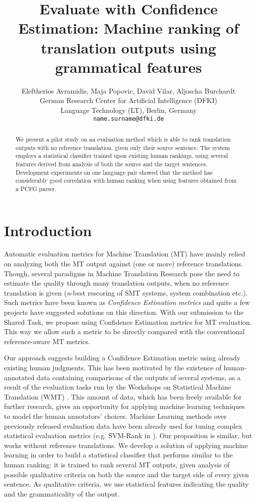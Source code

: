 \documentclass[11pt]{article}
\title{Evaluate with Confidence Estimation: Machine ranking of translation
outputs using grammatical features}
\author{
  Eleftherios Avramidis, Maja Popovic, David Vilar, Aljoscha Burchardt \\
  German Research Center for Artificial Intelligence (DFKI) \\
  Language Technology (LT), Berlin, Germany \\
  {\tt name.surname@dfki.de} 
  }
\date{}
\begin{document}
\maketitle
\begin{abstract}
We present a pilot study on an evaluation method which is able to rank 
translation outputs with no reference translation, given only their source sentence. The
system employs a statistical classifier trained upon existing human rankings, 
using several features derived from analysis of both the source and the target
sentences. Development experiments on one language pair showed that the method
has considerably good correlation with human ranking when using features
obtained from a PCFG parser.
  
\end{abstract}

\section{Introduction}
Automatic evaluation metrics for Machine Translation (MT) have mainly relied on
analyzing both the MT output against (one or more) reference translations.
Though, several paradigms in Machine Translation Research pose the need to
estimate the quality through many translation outputs, when no reference
translation is given (\textit{n}-best rescoring of SMT systems, system
combination etc.). Such metrics have been known as \textit{Confidence
Estimation metrics} and quite a few projects have suggested solutions on this direction. With our submission to the Shared Task,
we propose using Confidence Estimation metrics for MT evaluation. This way we
allow such a metric to be directly compared with the conventional
reference-aware MT metrics.

Our approach suggests building a Confidence Estimation metric using
already existing human judgments. This has been motivated by the existence
of human-annotated data containing comparisons of the outputs of several
systems, as a result of the evaluation tasks run by the Workshops on
Statistical Machine Translation
(\textsc{WMT})
\cite{callisonburch-EtAl:2008:WMT,callisonburch-EtAl:2009:WMT-09,callisonburch-EtAl:2010:WMT}. This amount of data, which has been freely available for further research, gives
an opportunity for applying machine learning techniques to model the human
annotators' choices. Machine Learning methods over previously released 
evaluation data have been already used for tuning complex
statistical evaluation metrics (e.g. SVM-Rank in
\cite{callisonburch-EtAl:2010:WMT}). %
Our proposition is similar, but works without reference translations. 
We develop a solution of applying machine learning in order to build a
statistical classifier that performs similar to the human ranking: it is trained
to rank several MT outputs, given analysis of possible qualitative criteria on
both the source and the target side of every given sentence. As qualitative
criteria, we use statistical features indicating the quality and
the grammaticality of the output.
\end{document}
